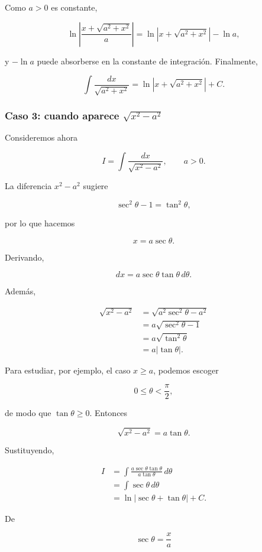 \documentclass[12pt]{article}
\theoremstyle{definition}
\theoremstyle{remark}
\begin{document}
Como $a>0$ es constante,

\[
\ln\left|\frac{x+\sqrt{a^2+x^2}}{a}\right|
=\ln|x+\sqrt{a^2+x^2}|-\ln a,
\]

y $-\ln a$ puede absorberse en la constante de integración. Finalmente,

\[
\boxed{
\int\frac{dx}{\sqrt{a^2+x^2}}
=\ln|x+\sqrt{a^2+x^2}|+C.}
\]

\subsubsection*{Caso 3: cuando aparece \(\sqrt{x^2-a^2}\)}

Consideremos ahora

\[
I=\int\frac{dx}{\sqrt{x^2-a^2}},\qquad a>0.
\]

La diferencia $x^2-a^2$ sugiere

\[
\sec^2\theta-1=\tan^2\theta,
\]

por lo que hacemos

\[
\boxed{x=a\sec\theta}.
\]

Derivando,

\[
dx=a\sec\theta\tan\theta\,d\theta.
\]

Además,

\begin{align*}
\sqrt{x^2-a^2}
&=\sqrt{a^2\sec^2\theta-a^2}\\
&=a\sqrt{\sec^2\theta-1}\\
&=a\sqrt{\tan^2\theta}\\
&=a|\tan\theta|.
\end{align*}

Para estudiar, por ejemplo, el caso $x\ge a$, podemos escoger

\[
0\leq\theta<\frac{\pi}{2},
\]

de modo que $\tan\theta\ge0$. Entonces

\[
\sqrt{x^2-a^2}=a\tan\theta.
\]

Sustituyendo,

\begin{align*}
I
&=\int
\frac{a\sec\theta\tan\theta}
     {a\tan\theta}\,d\theta\\
&=\int\sec\theta\,d\theta\\
&=\ln|\sec\theta+\tan\theta|+C.
\end{align*}

De

\[
\sec\theta=\frac{x}{a}
\]
\end{document}
